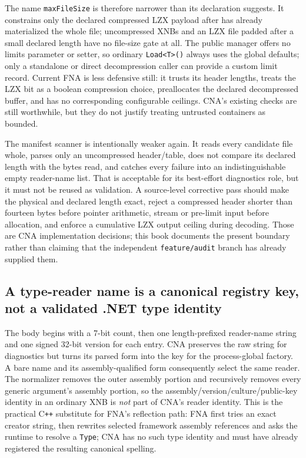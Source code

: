 The name \texttt{maxFileSize} is therefore narrower than its declaration suggests. It constrains
only the declared compressed LZX payload after  has already materialized
the whole file; uncompressed XNBs and an LZX file padded after a small declared length have no
file-size gate at all. The public manager offers no limits parameter or setter, so ordinary
\texttt{Load<T>()} always uses the global defaults; only a standalone  or
direct decompression caller can provide a custom limit record. Current FNA is less defensive still:
it trusts its header lengths, treats the LZX bit as a boolean compression choice, preallocates the
declared decompressed buffer, and has no corresponding configurable ceilings. CNA's existing
checks are still worthwhile, but they do not justify treating untrusted containers as bounded.

The manifest scanner is intentionally weaker again. It reads every candidate file whole, parses
only an uncompressed header/table, does not compare its declared length with the bytes read, and
catches every failure into an indistinguishable empty reader-name list. That is acceptable for its
best-effort diagnostics role, but it must not be reused as validation. A source-level corrective
pass should make the physical and declared length exact, reject a compressed header shorter than
fourteen bytes before pointer arithmetic, stream or pre-limit input before allocation, and enforce
a cumulative LZX output ceiling during decoding. Those are CNA implementation decisions; this
book documents the present boundary rather than claiming that the independent
\texttt{feature/audit} branch has already supplied them.

\subsection{A type-reader name is a canonical registry key, not a validated .NET type identity}
\label{sec:xnb-type-name-contract}

The body begins with a 7-bit count, then one length-prefixed reader-name string and one signed
32-bit version for each entry. CNA preserves the raw string for diagnostics but turns its parsed
form into the key for the process-global  factory. A bare
name and its assembly-qualified form consequently select the same reader. The normalizer removes
the outer assembly portion and recursively removes every generic argument's assembly portion, so
the assembly/version/culture/public-key identity in an ordinary XNB is \emph{not} part of CNA's
reader identity. This is the practical C\texttt{++} substitute for FNA's reflection path:
FNA first tries an exact creator string, then rewrites selected framework assembly references and
asks the runtime to resolve a \texttt{Type}; CNA has no such type identity and must have already
registered the resulting canonical spelling.

